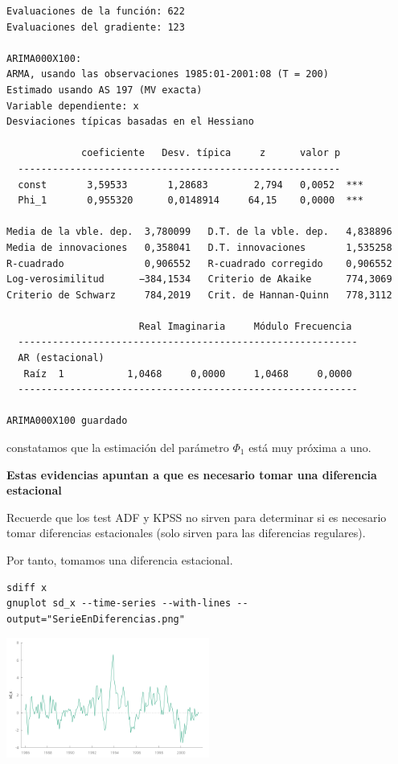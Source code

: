 \documentclass[10pt]{article}
\begin{document}
\begin{verbatim}
Evaluaciones de la función: 622
Evaluaciones del gradiente: 123

ARIMA000X100:
ARMA, usando las observaciones 1985:01-2001:08 (T = 200)
Estimado usando AS 197 (MV exacta)
Variable dependiente: x
Desviaciones típicas basadas en el Hessiano

             coeficiente   Desv. típica     z      valor p
  --------------------------------------------------------
  const       3,59533       1,28683        2,794   0,0052  ***
  Phi_1       0,955320      0,0148914     64,15    0,0000  ***

Media de la vble. dep.  3,780099   D.T. de la vble. dep.   4,838896
Media de innovaciones   0,358041   D.T. innovaciones       1,535258
R-cuadrado              0,906552   R-cuadrado corregido    0,906552
Log-verosimilitud      −384,1534   Criterio de Akaike      774,3069
Criterio de Schwarz     784,2019   Crit. de Hannan-Quinn   778,3112

                       Real Imaginaria     Módulo Frecuencia
  -----------------------------------------------------------
  AR (estacional)
   Raíz  1           1,0468     0,0000     1,0468     0,0000
  -----------------------------------------------------------

ARIMA000X100 guardado
\end{verbatim}

constatamos que la estimación del parámetro \(\Phi_1\) está muy próxima a uno.

\textbf{Estas evidencias apuntan a que es necesario tomar una diferencia
estacional}

Recuerde que los test ADF y KPSS no sirven para determinar si es
necesario tomar diferencias estacionales (solo sirven para las
diferencias regulares).

Por tanto, tomamos una diferencia estacional.

\begin{verbatim}
sdiff x
gnuplot sd_x --time-series --with-lines --output="SerieEnDiferencias.png"
\end{verbatim}

\begin{center}
\includegraphics[width=0.5\textwidth]{./SegundoEjercicioIdentificacionModeloARIMA/SerieEnDiferencias.png}
\end{center}
\end{document}
